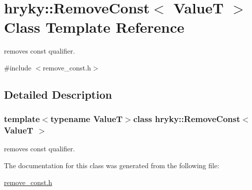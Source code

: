 \hypertarget{classhryky_1_1_remove_const}{\section{hryky\-:\-:Remove\-Const$<$ Value\-T $>$ Class Template Reference}
\label{classhryky_1_1_remove_const}
}


removes const qualifier.  




{\ttfamily \#include $<$remove\-\_\-const.\-h$>$}



\subsection{Detailed Description}
\subsubsection*{template$<$typename Value\-T$>$class hryky\-::\-Remove\-Const$<$ Value\-T $>$}

removes const qualifier. 

The documentation for this class was generated from the following file\-:\begin{DoxyCompactItemize}
\item 
\hyperlink{remove__const_8h}{remove\-\_\-const.\-h}\end{DoxyCompactItemize}
